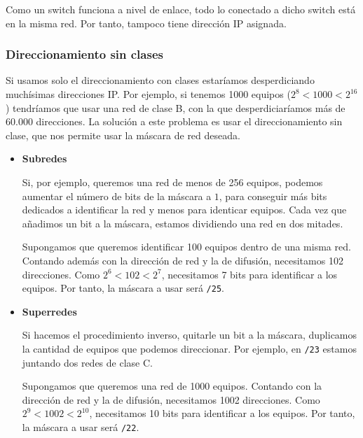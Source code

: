 \begin{observacion}
    Como un switch funciona a nivel de enlace, todo lo conectado a dicho switch está en la misma red. Por tanto, tampoco tiene dirección IP asignada.
\end{observacion}


\subsubsection{Direccionamiento sin clases}

Si usamos solo el direccionamiento con clases estaríamos desperdiciando muchísimas direcciones IP. Por ejemplo, si tenemos 1000 equipos ($2^8<1000<2^{16}$) tendríamos que usar una red de clase B, con la que desperdiciaríamos más de 60.000 direcciones. La solución a este problema es usar el direccionamiento sin clase, que nos permite usar la máscara de red deseada.

\begin{itemize}
    \item \textbf{Subredes}\

    Si, por ejemplo, queremos una red de menos de 256 equipos, podemos aumentar el número de bits de la máscara a $1$, para conseguir más bits dedicados a identificar la red y menos para identicar equipos. Cada vez que añadimos un bit a la máscara, estamos dividiendo una red en dos mitades. 
    \begin{ejemplo}
        Supongamos que queremos identificar 100 equipos dentro de una misma red. Contando además con la dirección de red y la de difusión, necesitamos 102 direcciones. Como $2^6<102<2^7$, necesitamos 7 bits para identificar a los equipos. Por tanto, la máscara a usar será \verb|/25|.
    \end{ejemplo}
        \item \textbf{Superredes}\

            Si hacemos el procedimiento inverso, quitarle un bit a la máscara, duplicamos la cantidad de equipos que podemos direccionar. Por ejemplo, en \verb|/23| estamos juntando dos redes de clase C. 
    \begin{ejemplo}
        Supongamos que queremos una red de 1000 equipos. Contando con la dirección de red y la de difusión, necesitamos 1002 direcciones. Como $2^9<1002<2^{10}$, necesitamos 10 bits para identificar a los equipos. Por tanto, la máscara a usar será \verb|/22|.
    \end{ejemplo}
\end{itemize}


